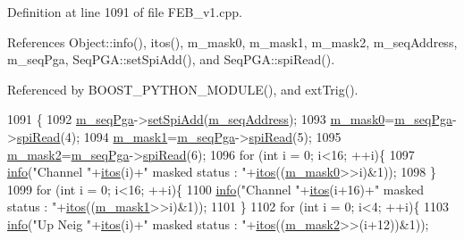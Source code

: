Definition at line 1091 of file F\+E\+B\+\_\+v1.\+cpp.



References Object\+::info(), itos(), m\+\_\+mask0, m\+\_\+mask1, m\+\_\+mask2, m\+\_\+seq\+Address, m\+\_\+seq\+Pga, Seq\+P\+G\+A\+::set\+Spi\+Add(), and Seq\+P\+G\+A\+::spi\+Read().



Referenced by B\+O\+O\+S\+T\+\_\+\+P\+Y\+T\+H\+O\+N\+\_\+\+M\+O\+D\+U\+L\+E(), and ext\+Trig().


\begin{DoxyCode}
1091                     \{
1092   \hyperlink{classFEB__v1_a6c7804ac86796f233a8393043adf2e77}{m\_seqPga}->\hyperlink{classSeqPGA_ac998ce3a6d9b5f2e88cc8393f8c1df53}{setSpiAdd}(\hyperlink{classFEB__v1_a1c1eb093fd1733b9510fcf8bc5c7ad08}{m\_seqAddress});
1093   \hyperlink{classFEB__v1_ab49d6a271bdfddd9c7fac9435e4e686d}{m\_mask0}=\hyperlink{classFEB__v1_a6c7804ac86796f233a8393043adf2e77}{m\_seqPga}->\hyperlink{classSeqPGA_ab3d0e5e5d4014bc7a92588a76b8713d4}{spiRead}(4);
1094   \hyperlink{classFEB__v1_a1cbadb02155e2defdff6d6c8f70eb945}{m\_mask1}=\hyperlink{classFEB__v1_a6c7804ac86796f233a8393043adf2e77}{m\_seqPga}->\hyperlink{classSeqPGA_ab3d0e5e5d4014bc7a92588a76b8713d4}{spiRead}(5);
1095   \hyperlink{classFEB__v1_a25f03f6de00618dd575fc1f77a9af9ee}{m\_mask2}=\hyperlink{classFEB__v1_a6c7804ac86796f233a8393043adf2e77}{m\_seqPga}->\hyperlink{classSeqPGA_ab3d0e5e5d4014bc7a92588a76b8713d4}{spiRead}(6);
1096   \textcolor{keywordflow}{for} (\textcolor{keywordtype}{int} i = 0; i<16; ++i)\{
1097     \hyperlink{classObject_a644fd329ea4cb85f54fa6846484b84a8}{info}(\textcolor{stringliteral}{"Channel "}+\hyperlink{Tools_8h_af330027dbdafb9a30768b3613c553e60}{itos}(i)+\textcolor{stringliteral}{" masked status : "}+\hyperlink{Tools_8h_af330027dbdafb9a30768b3613c553e60}{itos}((\hyperlink{classFEB__v1_ab49d6a271bdfddd9c7fac9435e4e686d}{m\_mask0}>>i)&1));
1098   \}
1099   \textcolor{keywordflow}{for} (\textcolor{keywordtype}{int} i = 0; i<16; ++i)\{
1100     \hyperlink{classObject_a644fd329ea4cb85f54fa6846484b84a8}{info}(\textcolor{stringliteral}{"Channel "}+\hyperlink{Tools_8h_af330027dbdafb9a30768b3613c553e60}{itos}(i+16)+\textcolor{stringliteral}{" masked status : "}+\hyperlink{Tools_8h_af330027dbdafb9a30768b3613c553e60}{itos}((\hyperlink{classFEB__v1_a1cbadb02155e2defdff6d6c8f70eb945}{m\_mask1}>>i)&1));
1101   \}  
1102   \textcolor{keywordflow}{for} (\textcolor{keywordtype}{int} i = 0; i<4; ++i)\{
1103     \hyperlink{classObject_a644fd329ea4cb85f54fa6846484b84a8}{info}(\textcolor{stringliteral}{"Up Neig "}+\hyperlink{Tools_8h_af330027dbdafb9a30768b3613c553e60}{itos}(i)+\textcolor{stringliteral}{" masked status : "}+\hyperlink{Tools_8h_af330027dbdafb9a30768b3613c553e60}{itos}((\hyperlink{classFEB__v1_a25f03f6de00618dd575fc1f77a9af9ee}{m\_mask2}>>(i+12))&1));

\end{DoxyCode}
